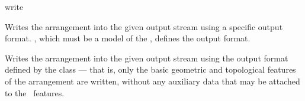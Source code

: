 
\ccRefPageBegin

\begin{ccRefFunction}{write}


   {Writes the arrangement  into the given output stream using a specific
    output format. , which must be a model of the
    , defines the output format.}

   {Writes the arrangement  into the given output stream using the
    output format defined by the  class --- that is,
    only the basic geometric and topological features of the arrangement are
    written, without any auxiliary data that may be attached to the \dcel\ features.}

\end{ccRefFunction}

\ccRefPageEnd

